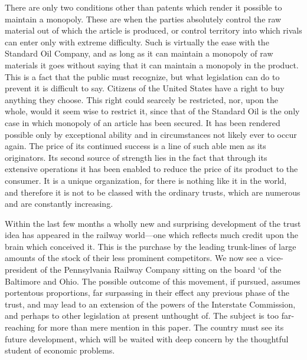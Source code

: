 \documentclass[11pt,openany]{book}
\begin{document}
There are only two conditions other than patents which render it possible to maintain a monopoly. These are when the parties absolutely control the raw material out of which the article is produced, or control territory into which rivals can enter only with extreme difficulty. Such is virtually the ease with the Standard Oil Company, and as long as it can maintain a monopoly of raw materials it goes without saying that it can maintain a monopoly in the product. This is a fact that the public must recognize, but what legislation can do to prevent it is difficult to say. Citizens of the United States have a right to buy anything they choose. This right could searcely be restricted, nor, upon the whole, would it seem wise to restrict it, since that of the Standard Oil is the only case in which monopoly of an article has been secured. It has been rendered possible only by exceptional ability and in circumstances not likely ever to occur again. The price of its continued success is a line of such able men as its originators. Its second source of strength lies in the fact that through its extensive operations it has been enabled to reduce the price of its product to the consumer. It is a unique organization, for there is nothing like it in the world, and therefore it is not to be classed with the ordinary trusts, which are numerous and are constantly increasing.

Within the last few months a wholly new and surprising development of the trust idea has appeared in the railway world---one which reflects much credit upon the brain which conceived it. This is the purchase by the leading trunk-lines of large amounts of the stock of their less prominent competitors. We now see a vice-president of the Pennsylvania Railway Company sitting on the board `of the Baltimore and Ohio. The possible outcome of this movement, if pursued, assumes portentous proportions, far surpassing in their effect any previous phase of the trust, and may lead to an extension of the powers of the Interstate Commission, and perhaps to other legislation at present unthought of. The subject is too far-reaching for more than mere mention in this paper. The country must see its future development, which will be waited with deep concern by the thoughtful student of economic problems.
\end{document}
